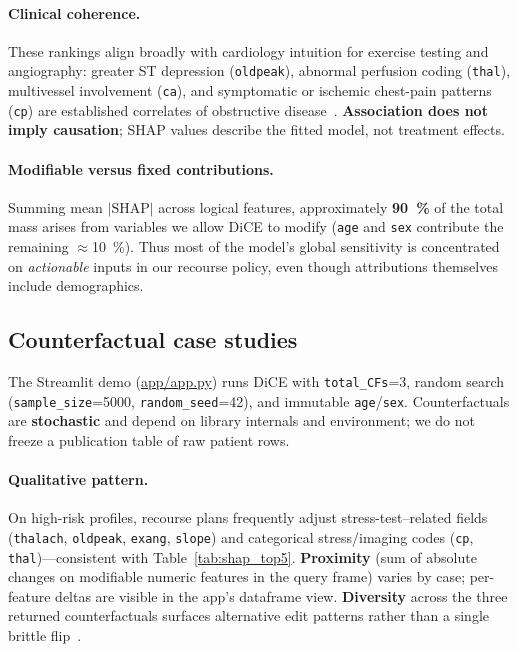 \documentclass[11pt,a4paper]{article}
\begin{document}
\paragraph{Clinical coherence.}
These rankings align broadly with cardiology intuition for exercise testing and angiography: greater ST depression (\texttt{oldpeak}), abnormal perfusion coding (\texttt{thal}), multivessel involvement (\texttt{ca}), and symptomatic or ischemic chest-pain patterns (\texttt{cp}) are established correlates of obstructive disease~\cite{detrano}. \textbf{Association does not imply causation}; SHAP values describe the fitted model, not treatment effects.

\paragraph{Modifiable versus fixed contributions.}
Summing mean $|\mathrm{SHAP}|$ across logical features, approximately \textbf{\SI{90}{\percent}} of the total mass arises from variables we allow DiCE to modify (\texttt{age} and \texttt{sex} contribute the remaining $\approx$\SI{10}{\percent}). Thus most of the model's global sensitivity is concentrated on \emph{actionable} inputs in our recourse policy, even though attributions themselves include demographics.

\subsection{Counterfactual case studies}
\label{sec:cf_cases}

The Streamlit demo (\url{app/app.py}) runs DiCE with \texttt{total\_CFs}=3, random search (\texttt{sample\_size}=5000, \texttt{random\_seed}=42), and immutable \texttt{age}/\texttt{sex}. Counterfactuals are \textbf{stochastic} and depend on library internals and environment; we do not freeze a publication table of raw patient rows.

\paragraph{Qualitative pattern.}
On high-risk profiles, recourse plans frequently adjust stress-test--related fields (\texttt{thalach}, \texttt{oldpeak}, \texttt{exang}, \texttt{slope}) and categorical stress/imaging codes (\texttt{cp}, \texttt{thal})—consistent with Table~\ref{tab:shap_top5}. \textbf{Proximity} (sum of absolute changes on modifiable numeric features in the query frame) varies by case; per-feature deltas are visible in the app's dataframe view. \textbf{Diversity} across the three returned counterfactuals surfaces alternative edit patterns rather than a single brittle flip~\cite{dice}.
\end{document}
